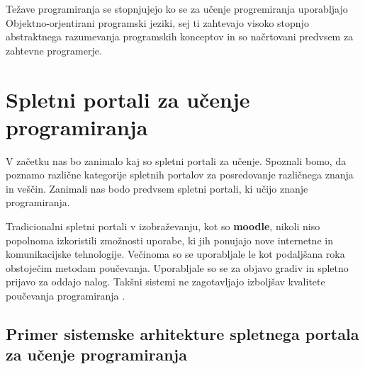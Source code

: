 Težave programiranja se stopnjujejo ko se za učenje progremiranja
uporabljajo Objektno-orjentirani programski jeziki, sej ti zahtevajo
visoko stopnjo abstraktnega razumevanja programskih konceptov in so
načrtovani predvsem za zahtevne programerje.



\section{Spletni portali za učenje programiranja}
\label{sec:SPUP}


V začetku nas bo zanimalo kaj so spletni portali za učenje. Spoznali
bomo, da poznamo različne kategorije spletnih portalov za posredovanje
različnega znanja in veščin. Zanimali nas bodo  predvsem spletni
portali, ki učijo znanje programiranja.

Tradicionalni spletni portali v izobraževanju, kot so \textbf{moodle},
nikoli niso popolnoma izkoristili zmožnosti uporabe, ki jih ponujajo
nove internetne in komunikacijske tehnologije. Večinoma so se
uporabljale le kot podaljšana roka obstoječim metodam
poučevanja. Uporabljale so se za objavo gradiv in spletno prijavo za
oddajo nalog. Takšni sistemi ne zagotavljajo izboljšav kvalitete
poučevanja programiranja \cite{ITaLCP_DistanceEdu}.



\subsection{Primer sistemske arhitekture spletnega portala za učenje
  programiranja}
\label{sec:Primer_aritekture_spletnega_portala}




